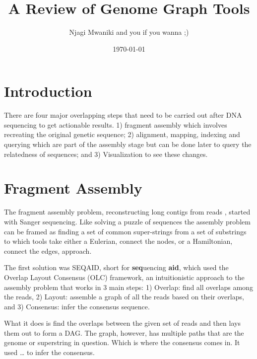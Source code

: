 \documentclass[11pt]{article}
\author{Njagi Mwaniki and you if you wanna ;)}
\date{\today}
\title{A Review of Genome Graph Tools}
\begin{document}
\maketitle
\begin{abstract}

\end{abstract}
\newpage
\tableofcontents
\listoffigures
\newpage
\section{Introduction}
\label{sec:org318c126}

There are four major overlapping steps that need to be carried out after DNA 
sequencing to get actionable results. 1) fragment assembly which involves 
recreating the original genetic sequence; 2) alignment, mapping, indexing and 
querying which are part of the assembly stage but can be done later to query the
relatedness of sequences; and 3) Visualization to see these changes.\cite{flicekSenseSequenceReads2009}

\section{Fragment Assembly}
\label{sec:org8cbfbb1}
The fragment assembly problem, reconstructing long contigs from reads
\cite{chikhiCompactingBruijnGraphs2016}, started with Sanger sequencing.
Like solving a puzzle of sequences the assembly problem can be framed as finding
a set of common super-strings from a set of substrings to which tools take 
either a Eulerian, connect the nodes, or a Hamiltonian, connect the edges, 
approach.

The first solution was SEQAID, short for \textbf{seq}uencing \textbf{aid},
\cite{peltolaSEQAIDDNASequence1984} which used the  Overlap Layout Consensus (OLC)
framework, an intuitionistic approach to the assembly problem that works in  
3 main steps: 1) Overlap: find all overlaps among the reads, 2) Layout: assemble
a graph of all the reads based on their overlaps, and 3) Consensus: infer the
consensus sequence.

What it does is find the overlaps between the given set of reads and then lays 
them out to form a DAG. The graph, however, has multiple paths that are the 
genome or superstring in question. Which is where the consensus comes in. 
It used … to infer the consensus.
\end{document}
